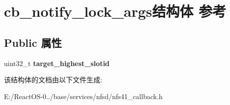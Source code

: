 \hypertarget{structcb__notify__lock__args}{}\section{cb\+\_\+notify\+\_\+lock\+\_\+args结构体 参考}
\label{structcb__notify__lock__args}
\subsection*{Public 属性}
\begin{DoxyCompactItemize}
\item 
\mbox{\label{structcb__notify__lock__args_a02d2a0a2d1ec165e2f66eb7a4051136a}} 
uint32\+\_\+t {\bfseries target\+\_\+highest\+\_\+slotid}
\end{DoxyCompactItemize}


该结构体的文档由以下文件生成\+:\begin{DoxyCompactItemize}
\item 
E\+:/\+React\+O\+S-\/0../base/services/nfsd/nfs41\+\_\+callback.\+h\end{DoxyCompactItemize}
